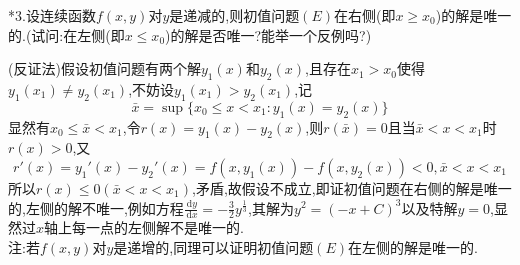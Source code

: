 \documentclass[titlepage,11pt,a4paper,twoside]{report}
\makeatletter
\newcommand\diff{\,\mathrm{d}}
\renewenvironment{proof}{\par
	\pushQED{\qed}%
	\normalfont \topsep1\p@\@plus6\p@\relax
	\trivlist
	\item\relax
	{\hspace*{\parindent}{\heiti 证明}\@addpunct{:}}\hspace\labelsep\ignorespaces
}{%
	\popQED\endtrivlist\@endpefalse
}
\makeatother
\begin{document}
*3.设连续函数$f(x,y)$对$y$是递减的,则初值问题$(E)$在右侧(即$x\geq x_0$)的解是唯一的.(试问:在左侧(即$x\leq x_0$)的解是否唯一?能举一个反例吗?)
\begin{proof}
(反证法)假设初值问题有两个解$y_1(x)$和$y_2(x)$,且存在$x_1>x_0$使得$y_1(x_1)\neq y_2(x_1)$,不妨设$y_1(x_1)>y_2(x_1)$,记
\[\bar{x}=\sup\{x_0\leq x<x_1:y_1(x)=y_2(x)\}\]
显然有$x_0\leq\bar{x}<x_1$,令$r(x)=y_1(x)-y_2(x)$,则$r(\bar{x})=0$且当$\bar{x}<x<x_1$时$r(x)>0$,又
\[r'(x)=y_1'(x)-y_2'(x)=f(x,y_1(x))-f(x,y_2(x))<0,\bar{x}<x<x_1\]
所以$r(x)\leq0(\bar{x}<x<x_1)$,矛盾,故假设不成立,即证初值问题在右侧的解是唯一的,左侧的解不唯一,例如方程$\frac{\diff y}{\diff x}=-\frac{3}{2}y^{\frac{1}{3}}$,其解为$y^2=(-x+C)^3$以及特解$y=0$,显然过$x$轴上每一点的左侧解不是唯一的.\\
注:若$f(x,y)$对$y$是递增的,同理可以证明初值问题$(E)$在左侧的解是唯一的.
\end{proof}
\end{document}
